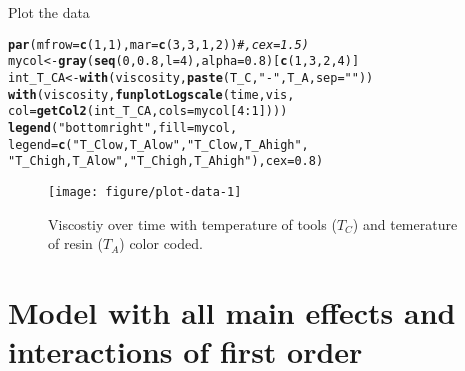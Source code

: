 \documentclass{article}\usepackage[]{graphicx}\usepackage[]{color}
\makeatletter
\def\maxwidth{ %
  \ifdim\Gin@nat@width>\linewidth
    \linewidth
  \else
    \Gin@nat@width
  \fi
}
\newcommand{\hlnum}[1]{\textcolor[rgb]{0.686,0.059,0.569}{#1}}%
\newcommand{\hlstr}[1]{\textcolor[rgb]{0.192,0.494,0.8}{#1}}%
\newcommand{\hlcom}[1]{\textcolor[rgb]{0.678,0.584,0.686}{\textit{#1}}}%
\newcommand{\hlopt}[1]{\textcolor[rgb]{0,0,0}{#1}}%
\newcommand{\hlstd}[1]{\textcolor[rgb]{0.345,0.345,0.345}{#1}}%
\newcommand{\hlkwb}[1]{\textcolor[rgb]{0.69,0.353,0.396}{#1}}%
\newcommand{\hlkwc}[1]{\textcolor[rgb]{0.333,0.667,0.333}{#1}}%
\newcommand{\hlkwd}[1]{\textcolor[rgb]{0.737,0.353,0.396}{\textbf{#1}}}%
\newenvironment{kframe}{%
 \def\at@end@of@kframe{}%
 \ifinner\ifhmode%
  \def\at@end@of@kframe{\end{minipage}}%
  \begin{minipage}{\columnwidth}%
 \fi\fi%
 \def\FrameCommand##1{\hskip\@totalleftmargin \hskip-\fboxsep
 \colorbox{shadecolor}{##1}\hskip-\fboxsep
     \hskip-\linewidth \hskip-\@totalleftmargin \hskip\columnwidth}%
 \MakeFramed {\advance\hsize-\width
   \@totalleftmargin\z@ \linewidth\hsize
   \@setminipage}}%
 {\par\unskip\endMakeFramed%
 \at@end@of@kframe}
\newenvironment{knitrout}{}{} %
\makeatother
\begin{document}
Plot the data

\begin{knitrout}
\color{fgcolor}\begin{kframe}
\begin{alltt}
\hlkwd{par}\hlstd{(}\hlkwc{mfrow}\hlstd{=}\hlkwd{c}\hlstd{(}\hlnum{1}\hlstd{,}\hlnum{1}\hlstd{),} \hlkwc{mar}\hlstd{=}\hlkwd{c}\hlstd{(}\hlnum{3}\hlstd{,} \hlnum{3}\hlstd{,} \hlnum{1}\hlstd{,} \hlnum{2}\hlstd{))}\hlcom{#, cex=1.5)}
\hlstd{mycol} \hlkwb{<-} \hlkwd{gray}\hlstd{(}\hlkwd{seq}\hlstd{(}\hlnum{0}\hlstd{,} \hlnum{0.8}\hlstd{,} \hlkwc{l}\hlstd{=}\hlnum{4}\hlstd{),} \hlkwc{alpha}\hlstd{=}\hlnum{0.8}\hlstd{)[}\hlkwd{c}\hlstd{(}\hlnum{1}\hlstd{,}\hlnum{3}\hlstd{,}\hlnum{2}\hlstd{,}\hlnum{4}\hlstd{)]}
\hlstd{int_T_CA} \hlkwb{<-} \hlkwd{with}\hlstd{(viscosity,} \hlkwd{paste}\hlstd{(T_C,}\hlstr{"-"}\hlstd{, T_A,} \hlkwc{sep}\hlstd{=}\hlstr{""}\hlstd{))}
\hlkwd{with}\hlstd{(viscosity,} \hlkwd{funplotLogscale}\hlstd{(time, vis,}
                                \hlkwc{col}\hlstd{=}\hlkwd{getCol2}\hlstd{(int_T_CA,} \hlkwc{cols}\hlstd{=mycol[}\hlnum{4}\hlopt{:}\hlnum{1}\hlstd{])))}
\hlkwd{legend}\hlstd{(}\hlstr{"bottomright"}\hlstd{,} \hlkwc{fill}\hlstd{=mycol,}
       \hlkwc{legend}\hlstd{=}\hlkwd{c}\hlstd{(}\hlstr{"T_C low, T_A low"}\hlstd{,} \hlstr{"T_C low, T_A high"}\hlstd{,}
                \hlstr{"T_C high, T_A low"}\hlstd{,} \hlstr{"T_C high, T_A high"}\hlstd{),} \hlkwc{cex} \hlstd{=} \hlnum{0.8}\hlstd{)}
\end{alltt}
\end{kframe}\begin{figure}

{\centering \texttt{[image: figure/plot-data-1]} 

}

\caption[Viscostiy over time with temperature of tools ($T_C$) and temerature of resin ($T_A$) color coded]{Viscostiy over time with temperature of tools ($T_C$) and temerature of resin ($T_A$) color coded.}\label{fig:plot-data}
\end{figure}


\end{knitrout}


\newpage

\section{Model with all main effects and interactions of first order}
\end{document}
